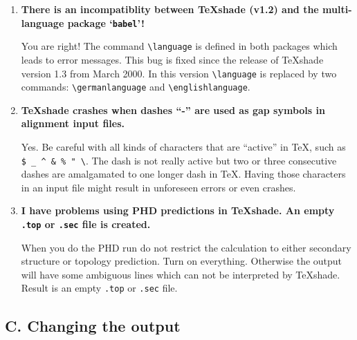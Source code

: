 \documentclass[12pt]{article}
\begin{document}
\begin{enumerate}
    
    \item
    
    \textbf{There is an incompatiblity between \TeX{}shade (v1.2)
    and the multi-language package `\texttt{babel}'!}
    
    You are right! The command \verb|\language| is defined in both
    packages which leads to error messages. This bug is fixed since
    the release of \TeX{}shade version 1.3 from March 2000. In this 
    version \verb|\language| is replaced by two commands: 
    \verb|\germanlanguage| and \verb|\englishlanguage|.
    
    \item
    
    \textbf{\TeX{}shade crashes when dashes ``-'' are used as gap 
    symbols in alignment input files.}
    
    Yes. Be careful with all kinds of characters that are ``active'' 
    in \TeX{}, such as \verb|$ _ ^ & % " \|. The dash is not really active 
    but two or three consecutive dashes are amalgamated to one longer 
    dash in \TeX. Having those characters in an input file might result 
    in unforeseen errors or even crashes. 
    
    \item
    
    \textbf{I have problems using PHD predictions in \TeX{}shade. An
    empty \texttt{.top} or \texttt{.sec} file is created.}
    
    When you do the PHD run do not restrict the calculation to either
    secondary structure or topology prediction. Turn on everything. 
    Otherwise the output will have some ambiguous lines which can not 
    be interpreted by \TeX{}shade. Result is an empty 
    \texttt{.top} or \texttt{.sec} file.

\end{enumerate}



\subsection*{C. Changing the output}
\medskip 
\end{document}
